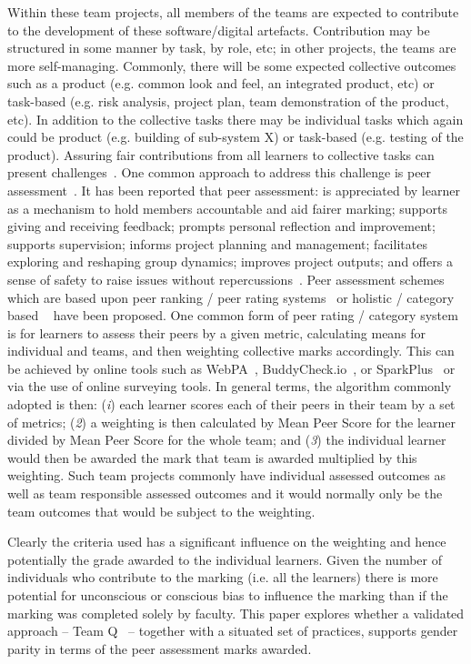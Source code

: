 \documentclass[sigconf, anonymous=false]{acmart}
\begin{document}
Within these team projects, all members of the teams are expected to
contribute to the development of these software/digital
artefacts. Contribution may be structured in some manner by
task, by role, etc; in other projects, the teams are more
self-managing. Commonly, there will be some expected collective
outcomes such as a product (e.g. common look and
feel, an integrated product, etc) or task-based (e.g. risk analysis,
project plan, team demonstration of the product, etc).  In addition to
the collective tasks there may be individual tasks which again could
be product (e.g. building of sub-system X) or task-based (e.g. testing
of the product). Assuring fair contributions from all learners to
collective tasks can present challenges~\cite{Philips21}. One common
approach to address this challenge is peer
assessment~\cite{Gordon2010}. It has been reported that peer assessment: is appreciated by learner as a mechanism to hold members
accountable and aid fairer marking; supports giving and
receiving feedback; prompts personal reflection and improvement;
supports supervision; informs project planning and management;
facilitates exploring and reshaping group dynamics; improves project
outputs; and offers a sense of safety to raise issues without
repercussions~\cite{Mitchell2021}. Peer assessment schemes which are
based upon peer ranking /  peer rating systems~\cite{Yanbin2005} or holistic / category based ~\cite{Lejk2001} have
been proposed. One common form of peer rating / category system is for learners
to assess their peers by a given metric, calculating means for
individual and teams, and then weighting collective marks
accordingly. This can be achieved by online tools such as
WebPA~\cite{WebPA}, BuddyCheck.io~\cite{BuddyCheck}, or
SparkPlus~\cite{SparkPlus} or via the use of online surveying
tools. In general terms, the algorithm commonly adopted is then:
({\emph{i}}) each learner scores each of their peers in their team by
a set of metrics; ({\emph{2}}) a weighting is then calculated by Mean
Peer Score for the learner divided by Mean Peer Score for the whole
team; and ({\emph{3}}) the individual learner would then be awarded
the mark that team is awarded multiplied by this weighting. Such team
projects commonly have individual assessed outcomes as well as team
responsible assessed outcomes and it would normally only be the team
outcomes that would be subject to the weighting.

Clearly the criteria used has a significant influence on the weighting
and hence potentially the grade awarded to the individual
learners. Given the number of individuals who contribute to the
marking (i.e. all the learners) there is more potential for
unconscious or conscious bias to influence the marking than if the
marking was completed solely by faculty. This paper explores whether a
validated approach -- Team Q~\cite{Britton2017} -- together with a
situated set of practices, supports gender parity in terms of the peer
assessment marks awarded.
\end{document}

